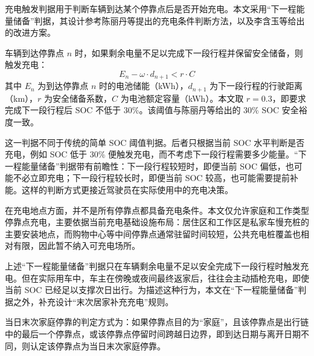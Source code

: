 \documentclass[10pt,a4paper]{article}
\numberwithin{equation}{section}
\numberwithin{table}{section}
\numberwithin{figure}{section}
\begin{document}
    充电触发判据用于判断车辆到达某个停靠点后是否开始充电。本文采用“下一程能量储备”判据，其设计参考陈丽丹等\supercite{ref9}提出的充电条件判断方法，以及李含玉等\supercite{ref10}给出的改进方案。

    车辆到达停靠点 $n$ 时，如果剩余电量不足以完成下一段行程并保留安全储备，则触发充电：
    \begin{equation}
    \label{eq:charge_trigger}
    E_n - \omega \cdot d_{n+1} < r \cdot C
    \end{equation}
    其中 $E_n$ 为到达停靠点 $n$ 时的电池储能（kWh），$d_{n+1}$ 为下一段行程的行驶距离（km），$r$ 为安全储备系数，$C$ 为电池额定容量（kWh）。本文取 $r = 0.3$，即要求完成下一段行程后 SOC 不低于 30\%。该阈值与陈丽丹等\supercite{ref9}给出的 30\% SOC 安全裕度一致。

    这一判据不同于传统的简单 SOC 阈值判据。后者只根据当前 SOC 水平判断是否充电，例如 SOC 低于 30\% 便触发充电，而不考虑下一段行程需要多少能量。“下一程能量储备”判据带有前瞻性：下一段行程较短时，即便当前 SOC 偏低，也可能不必立即充电；下一段行程较长时，即便当前 SOC 较高，也可能需要提前补能。这样的判断方式更接近驾驶员在实际使用中的充电决策\supercite{ref9,ref10}。

    在充电地点方面，并不是所有停靠点都具备充电条件。本文仅允许家庭和工作类型停靠点充电，主要依据当前充电基础设施布局：居住区和工作区是私家车慢充桩的主要安装地点，而购物中心等中间停靠点通常驻留时间较短，公共充电桩覆盖也相对有限，因此暂不纳入可充电场所。

    上述“下一程能量储备”判据只在车辆剩余电量不足以安全完成下一段行程时触发充电。但在实际用车中，车主在傍晚或夜间最终返家后，往往会主动插枪充电，即使当前 SOC 已经足以支撑次日出行。为描述这种行为，本文在“下一程能量储备”判据之外，补充设计“末次居家补充充电”规则。

    当日末次家庭停靠的判定方式为：如果停靠点目的为“家庭”，且该停靠点是出行链中的最后一个停靠点，或该停靠点停留时间跨越日边界，即到达日期与离开日期不同，则认定该停靠点为当日末次家庭停靠。
\end{document}
